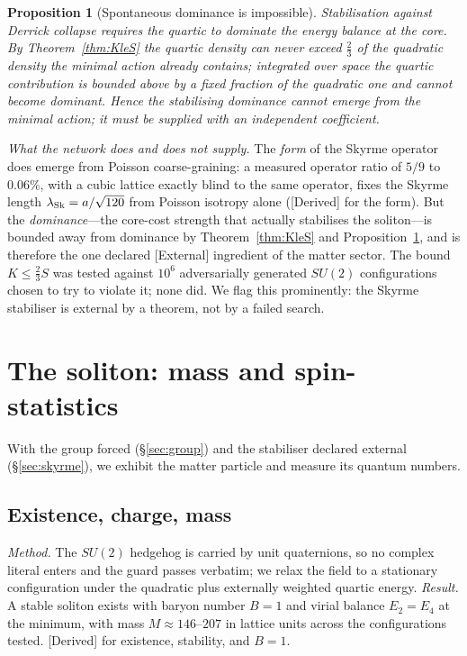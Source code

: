 \documentclass[aps,prd,reprint,nofootinbib,superscriptaddress,floatfix]{revtex4-2}
\theoremstyle{plain}
\newtheorem{proposition}{Proposition}
\newcommand{\Sderiv}{\textsf{[Derived]}}
\newcommand{\Sext}{\textsf{[External]}}
\newcommand{\su}[1]{SU(#1)}
\begin{document}
\begin{proposition}[Spontaneous dominance is impossible]\label{prop:nodom}
Stabilisation against Derrick collapse requires the quartic to dominate the energy
balance at the core. By Theorem~\ref{thm:KleS} the quartic density can never exceed
$\tfrac23$ of the quadratic density the minimal action already contains; integrated
over space the quartic contribution is bounded above by a fixed fraction of the
quadratic one and cannot become dominant. Hence the stabilising dominance cannot
emerge from the minimal action; it must be supplied with an independent coefficient.
\end{proposition}

\emph{What the network does and does not supply.} The \emph{form} of the Skyrme
operator does emerge from Poisson coarse-graining: a measured operator ratio of $5/9$
to $0.06\%$, with a cubic lattice exactly blind to the same operator, fixes the Skyrme
length $\lambda_{\rm Sk}=a/\sqrt{120}$ from Poisson isotropy alone (\Sderiv{} for the
form). But the \emph{dominance}---the core-cost strength that actually stabilises the
soliton---is bounded away from dominance by Theorem~\ref{thm:KleS} and
Proposition~\ref{prop:nodom}, and is therefore the one declared \Sext{} ingredient of
the matter sector. The bound $K\le\tfrac23 S$ was tested against $10^6$ adversarially
generated $\su2$ configurations chosen to try to violate it; none did. We flag this
prominently: the Skyrme stabiliser is external by a theorem, not by a failed search.

\section{The soliton: mass and spin-statistics}\label{sec:soliton}

With the group forced (\S\ref{sec:group}) and the stabiliser declared external
(\S\ref{sec:skyrme}), we exhibit the matter particle and measure its quantum numbers.

\subsection{Existence, charge, mass}
\emph{Method.} The $\su2$ hedgehog is carried by unit quaternions, so no complex
literal enters and the guard passes verbatim; we relax the field to a stationary
configuration under the quadratic plus externally weighted quartic energy.
\emph{Result.} A stable soliton exists with baryon number $B=1$ and virial balance
$E_2=E_4$ at the minimum, with mass $M\approx146$--$207$ in lattice units across the
configurations tested. \Sderiv{} for existence, stability, and $B=1$.
\end{document}
